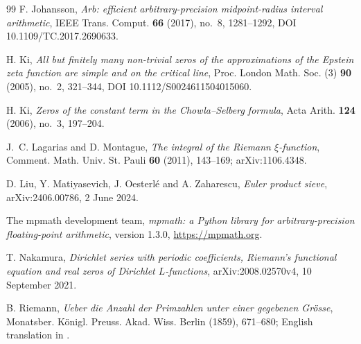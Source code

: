 \documentclass[11pt]{article}
\theoremstyle{plain}
\theoremstyle{definition}
\theoremstyle{remark}
\begin{document}
\begin{thebibliography}{99}
 F. Johansson, \emph{Arb: efficient arbitrary-precision
midpoint-radius interval arithmetic}, IEEE Trans. Comput. \textbf{66} (2017),
no.~8, 1281--1292, DOI 10.1109/TC.2017.2690633.

 H. Ki, \emph{All but finitely many non-trivial zeros of the
approximations of the Epstein zeta function are simple and on the critical line},
Proc. London Math. Soc. (3) \textbf{90} (2005), no.~2, 321--344,
DOI 10.1112/S0024611504015060.

 H. Ki, \emph{Zeros of the constant term in the
Chowla--Selberg formula}, Acta Arith. \textbf{124} (2006), no.~3, 197--204.

 J.~C. Lagarias and D. Montague, \emph{The integral of the
Riemann $\xi$-function}, Comment. Math. Univ. St. Pauli \textbf{60} (2011),
143--169; arXiv:1106.4348.

 D. Liu, Y. Matiyasevich, J. Oesterl\'e and
A. Zaharescu, \emph{Euler product sieve}, arXiv:2406.00786, 2 June 2024.

 The mpmath development team, \emph{mpmath: a Python
library for arbitrary-precision floating-point arithmetic}, version 1.3.0,
\url{https://mpmath.org}.

 T. Nakamura, \emph{Dirichlet series with periodic
coefficients, Riemann's functional equation and real zeros of Dirichlet
$L$-functions}, arXiv:2008.02570v4, 10 September 2021.

 B. Riemann, \emph{Ueber die Anzahl der Primzahlen unter
einer gegebenen Gr\"osse}, Monatsber. K\"onigl. Preuss. Akad. Wiss. Berlin
(1859), 671--680; English translation in \cite[Appendix]{Edw}.

\end{thebibliography}
\end{document}
